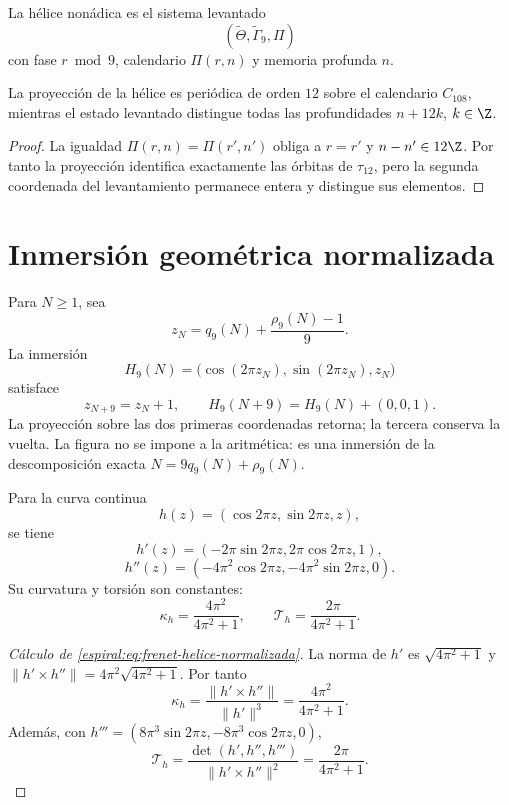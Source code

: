 \begin{definition}
La hélice nonádica es el sistema levantado
\[
 (\widetilde\Theta,\widetilde\Gamma_9,\Pi)
\]
con fase \(r\bmod9\), calendario \(\Pi(r,n)\) y memoria profunda \(n\).
\end{definition}

\begin{theorem}
La proyección de la hélice es periódica de orden \(12\) sobre el calendario
\(C_{108}\), mientras el estado levantado distingue todas las profundidades
\(n+12k\), \(k\in\Z\).
\end{theorem}
\begin{proof}
La igualdad \(\Pi(r,n)=\Pi(r',n')\) obliga a \(r=r'\) y
\(n-n'\in12\Z\). Por tanto la proyección identifica exactamente las
órbitas de \(\tau_{12}\), pero la segunda coordenada del levantamiento
permanece entera y distingue sus elementos.
\end{proof}

\section{Inmersión geométrica normalizada}

Para \(N\ge1\), sea
\[
 z_N=q_9(N)+\frac{\rho_9(N)-1}{9}.
\]
La inmersión
\begin{equation}
 H_9(N)=\bigl(\cos(2\pi z_N),\sin(2\pi z_N),z_N\bigr)
 \label{espiral:eq:inmersion-helice-nonadica}
\end{equation}
satisface
\[
 z_{N+9}=z_N+1,
 \qquad
 H_9(N+9)=H_9(N)+(0,0,1).
\]
La proyección sobre las dos primeras coordenadas retorna; la tercera conserva
la vuelta. La figura no se impone a la aritmética: es una inmersión de la
descomposición exacta \(N=9q_9(N)+\rho_9(N)\).

Para la curva continua
\[
 h(z)=(\cos2\pi z,\sin2\pi z,z),
\]
se tiene
\[
 h'(z)=(-2\pi\sin2\pi z,2\pi\cos2\pi z,1),
\]
\[
 h''(z)=(-4\pi^2\cos2\pi z,-4\pi^2\sin2\pi z,0).
\]
Su curvatura y torsión son constantes:
\begin{equation}
 \kappa_h=\frac{4\pi^2}{4\pi^2+1},
 \qquad
 \mathcal T_h=\frac{2\pi}{4\pi^2+1}.
 \label{espiral:eq:frenet-helice-normalizada}
\end{equation}

\begin{proof}[Cálculo de \cref{espiral:eq:frenet-helice-normalizada}]
La norma de \(h'\) es \(\sqrt{4\pi^2+1}\) y
\(\|h'\times h''\|=4\pi^2\sqrt{4\pi^2+1}\). Por tanto
\[
 \kappa_h=\frac{\|h'\times h''\|}{\|h'\|^3}
 =\frac{4\pi^2}{4\pi^2+1}.
\]
Además, con \(h'''=(8\pi^3\sin2\pi z,-8\pi^3\cos2\pi z,0)\),
\[
 \mathcal T_h=
 \frac{\det(h',h'',h''')}{\|h'\times h''\|^2}
 =\frac{2\pi}{4\pi^2+1}.
\]
\end{proof}


